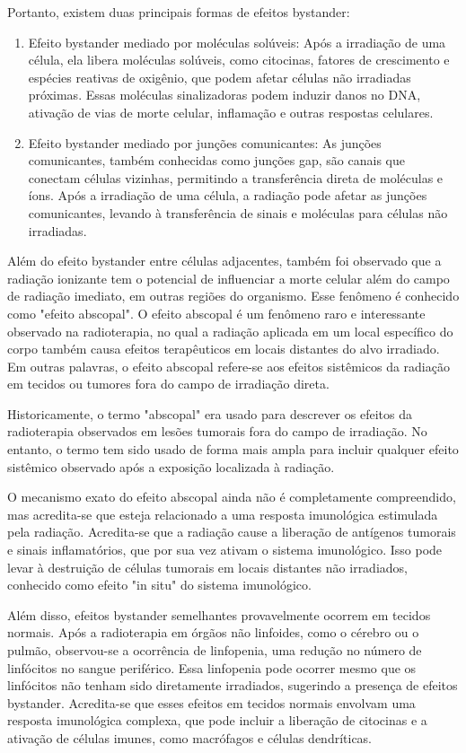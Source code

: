 \documentclass[11pt,a4paper]{article}
\begin{document}
	Portanto, existem duas principais formas de efeitos bystander:

	\begin{enumerate}
		\item Efeito bystander mediado por moléculas solúveis: Após a irradiação de uma célula, ela libera moléculas solúveis, como citocinas, fatores de crescimento e espécies reativas de oxigênio, que podem afetar células não irradiadas próximas. Essas moléculas sinalizadoras podem induzir danos no DNA, ativação de vias de morte celular, inflamação e outras respostas celulares.
		\item Efeito bystander mediado por junções comunicantes: As junções comunicantes, também conhecidas como junções gap, são canais que conectam células vizinhas, permitindo a transferência direta de moléculas e íons. Após a irradiação de uma célula, a radiação pode afetar as junções comunicantes, levando à transferência de sinais e moléculas para células não irradiadas.
	\end{enumerate}


	Além do efeito bystander entre células adjacentes, também foi observado que a radiação ionizante tem o potencial de influenciar a morte celular além do campo de radiação imediato, em outras regiões do organismo. Esse fenômeno é conhecido como "efeito abscopal". O efeito abscopal é um fenômeno raro e interessante observado na radioterapia, no qual a radiação aplicada em um local específico do corpo também causa efeitos terapêuticos em locais distantes do alvo irradiado. Em outras palavras, o efeito abscopal refere-se aos efeitos sistêmicos da radiação em tecidos ou tumores fora do campo de irradiação direta.

	Historicamente, o termo "abscopal" era usado para descrever os efeitos da radioterapia observados em lesões tumorais fora do campo de irradiação. No entanto, o termo tem sido usado de forma mais ampla para incluir qualquer efeito sistêmico observado após a exposição localizada à radiação.
	
	O mecanismo exato do efeito abscopal ainda não é completamente compreendido, mas acredita-se que esteja relacionado a uma resposta imunológica estimulada pela radiação. Acredita-se que a radiação cause a liberação de antígenos tumorais e sinais inflamatórios, que por sua vez ativam o sistema imunológico. Isso pode levar à destruição de células tumorais em locais distantes não irradiados, conhecido como efeito "in situ" do sistema imunológico.
	

	Além disso, efeitos bystander semelhantes provavelmente ocorrem em tecidos normais. Após a radioterapia em órgãos não linfoides, como o cérebro ou o pulmão, observou-se a ocorrência de linfopenia, uma redução no número de linfócitos no sangue periférico. Essa linfopenia pode ocorrer mesmo que os linfócitos não tenham sido diretamente irradiados, sugerindo a presença de efeitos bystander. Acredita-se que esses efeitos em tecidos normais envolvam uma resposta imunológica complexa, que pode incluir a liberação de citocinas e a ativação de células imunes, como macrófagos e células dendríticas.
\end{document}
